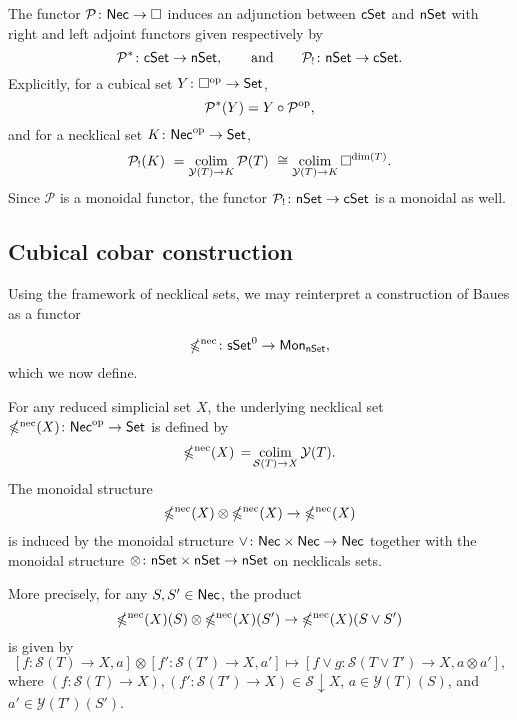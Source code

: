 The functor $\mathcal{P} \colon \mathsf{Nec} \to \square$ induces an adjunction between $\mathsf{cSet}$ and $\mathsf{nSet}$ with right and left adjoint functors given respectively by
\begin{equation*}
\mathcal{P}^\ast \colon \mathsf{cSet} \to \mathsf{nSet},
\qquad \text{and} \qquad
\mathcal{P}_{!}  \colon \mathsf{nSet} \to \mathsf{cSet}.
\end{equation*}
Explicitly, for a cubical set $Y \colon \square^{\mathrm{op}} \to \mathsf{Set}$,
\begin{equation*}
\mathcal{P}^\ast(Y)= Y \circ \mathcal{P}^{\mathrm{op}},
\end{equation*}
and for a necklical set $K \colon \mathsf{Nec}^{\mathrm{op}} \to \mathsf{Set}$,
\begin{equation*}
\mathcal{P}_{!}(K) \ =
\operatorname*{colim}_{\mathcal{Y}(T) \to K} \mathcal{P}(T) \ \cong 
\operatorname*{colim}_{\mathcal{Y}(T) \to K} \square^{\dim(T)}.
\end{equation*}
Since $\mathcal{P}$ is a monoidal functor, the functor $\mathcal{P}_{!} \colon \mathsf{nSet} \to \mathsf{cSet}$ is a monoidal as well.

\subsection{Cubical cobar construction}

Using the framework of necklical sets, we may reinterpret a construction of Baues as a functor


\begin{equation*}
\operatorname{\mathbb{\Omega}^{\mathrm{nec}}} \colon \mathsf{sSet}^0 \to \mathsf{Mon}_{\mathsf{nSet}},
\end{equation*}
which we now define.

For any reduced simplicial set $X$, the underlying necklical set $\operatorname{\mathbb{\Omega}^{\mathrm{nec}}}(X) \colon \mathsf{Nec}^{\mathrm{op}} \to \mathsf{Set}$ is defined by
\begin{equation*}
\operatorname{\mathbb{\Omega}^{\mathrm{nec}}}(X) \, = \! \operatorname*{colim}_{\mathcal{S}(T) \to X} \mathcal{Y}(T).
\end{equation*}
The monoidal structure
$$\operatorname{\mathbb{\Omega}^{\mathrm{nec}}}(X) \otimes \operatorname{\mathbb{\Omega}^{\mathrm{nec}}}(X) \to \operatorname{\mathbb{\Omega}^{\mathrm{nec}}}(X)$$
is induced by the monoidal structure $\vee \colon \mathsf{Nec} \times \mathsf{Nec} \to \mathsf{Nec}$ together with the monoidal structure $\otimes \colon \mathsf{nSet} \times \mathsf{nSet} \to \mathsf{nSet}$ on necklicals sets.


More precisely, for any $S, S' \in \mathsf{Nec}$, the product
$$\operatorname{\mathbb{\Omega}^{\mathrm{nec}}}(X)(S) \otimes \operatorname{\mathbb{\Omega}^{\mathrm{nec}}}(X)(S') \to \operatorname{\mathbb{\Omega}^{\mathrm{nec}}}(X)(S \vee S')$$
is given by
$$[f\colon \mathcal{S}(T) \to X, a] \otimes [f'\colon \mathcal{S}(T') \to X, a'] \mapsto [f \vee g\colon \mathcal{S}(T\vee T') \to X, a \otimes  a'],$$
where $(f\colon \mathcal{S}(T) \to X), (f'\colon \mathcal{S}(T') \to X) \in \mathcal{S} \downarrow X$, $a \in \mathcal{Y}(T)(S)$, and $a'\in \mathcal{Y}(T')(S')$.

